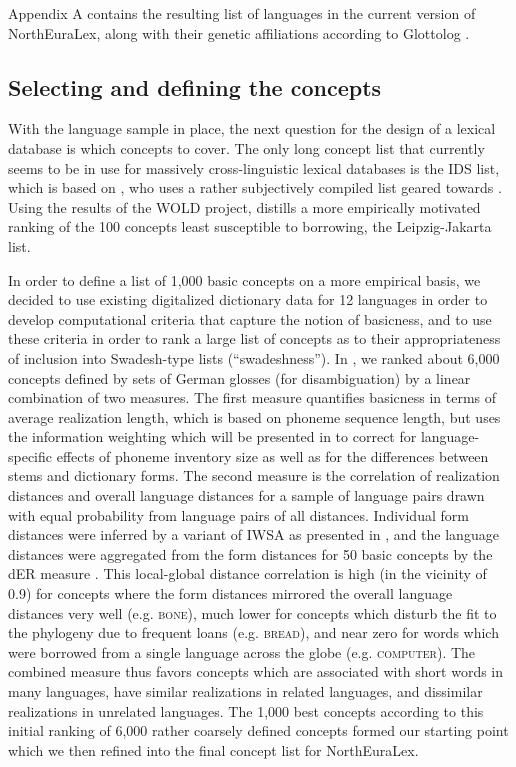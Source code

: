 Appendix A contains the resulting list of languages in the current version of NorthEuraLex,
along with their genetic affiliations according to Glottolog \citep{glottolog}.

\subsection{Selecting and defining the concepts}
With the language sample in place, the next question for the design of a lexical database is which concepts to cover. The only long concept list that currently seems to be in use for massively cross-linguistic lexical databases is the IDS list, which is based on \cite{buck1949}, who uses a rather subjectively compiled list geared towards . Using the results of the WOLD project, \cite{tadmor2009} distills a more empirically motivated ranking of the 100 concepts least susceptible to borrowing, the Leipzig-Jakarta list.

In order to define a list of 1,000 basic concepts on a more empirical basis, we decided to use existing digitalized dictionary data for 12 languages in order to develop computational criteria that capture the notion of basicness, and to use these criteria in order to rank a large list of concepts as to their appropriateness of inclusion into Swadesh-type lists (``swadeshness''). In \cite{dellert_buch_2015}, we ranked about 6,000 concepts defined by sets of German glosses (for disambiguation) by a linear combination of two measures. The first measure quantifies basicness in terms of average realization length, which is based on phoneme sequence length, but uses the information weighting which will be presented in  to correct for language-specific effects of phoneme inventory size as well as for the differences between stems and dictionary forms. The second measure is the correlation of realization distances and overall language distances for a sample of language pairs drawn with equal probability 
from language pairs of all distances. Individual form distances were inferred by a variant of IWSA as presented in , and the language distances were aggregated from the form distances for 50 basic concepts by the dER measure \citep{jaeger2013}. This local-global distance correlation is high (in the vicinity of 0.9) for concepts where the form distances mirrored the overall language distances very well (e.g. \textsc{bone}), much lower for concepts which disturb the fit to the phylogeny due to frequent loans (e.g. \textsc{bread}), and near zero for words which were borrowed from a single language across the globe (e.g. \textsc{computer}). The combined measure thus favors concepts which are associated with short words in many languages, have similar realizations in related languages, and dissimilar realizations in unrelated languages. The 1,000 best concepts according to this initial ranking of 6,000 rather coarsely defined concepts formed our starting point which we then refined into the final concept list for NorthEuraLex.

